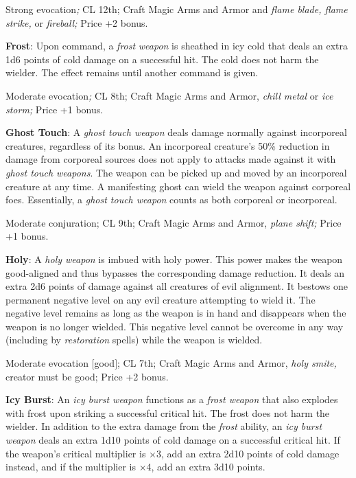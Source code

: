 Strong evocation\textit{; }CL 12th; Craft Magic Arms and Armor and \textit{flame blade, flame strike, }or \textit{fireball; }Price +2 bonus.
				
\textbf{Frost}: Upon command, a \textit{frost} \textit{weapon} is sheathed in icy cold that deals an extra 1d6 points of cold damage on a successful hit. The cold does not harm the wielder. The effect remains until another command is given.
				
Moderate evocation\textit{; }CL 8th; Craft Magic Arms and Armor, \textit{chill metal }or \textit{ice storm; }Price +1 bonus.
				
\textbf{Ghost Touch}: A \textit{ghost touch weapon} deals damage normally against incorporeal creatures, regardless of its bonus. An incorporeal creature's 50\% reduction in damage from corporeal sources does not apply to attacks made against it with \textit{ghost touch weapons}. The weapon can be picked up and moved by an incorporeal creature at any time. A manifesting ghost can wield the weapon against corporeal foes. Essentially, a \textit{ghost touch weapon} counts as both corporeal or incorporeal.
				
Moderate conjuration; CL 9th; Craft Magic Arms and Armor, \textit{plane shift; }Price +1 bonus.
				
\textbf{Holy}: A \textit{holy weapon} is imbued with holy power. This power makes the weapon good-aligned and thus bypasses the corresponding damage reduction. It deals an extra 2d6 points of damage against all creatures of evil alignment. It bestows one permanent negative level on any evil creature attempting to wield it. The negative level remains as long as the weapon is in hand and disappears when the weapon is no longer wielded. This negative level cannot be overcome in any way (including by \textit{restoration }spells) while the weapon is wielded.
				
Moderate evocation \mbox{$[$}good\mbox{$]$}; CL 7th; Craft Magic Arms and Armor, \textit{holy smite, }creator must be good; Price +2 bonus.
				
\textbf{Icy Burst}: An \textit{icy burst weapon} functions as a \textit{frost weapon} that also explodes with frost upon striking a successful critical hit. The frost does not harm the wielder. In addition to the extra damage from the \textit{frost} ability, an \textit{icy burst weapon} deals an extra 1d10 points of cold damage on a successful critical hit. If the weapon's critical multiplier is \mbox{$\times$}3, add an extra 2d10 points of cold damage instead, and if the multiplier is \mbox{$\times$}4, add an extra 3d10 points. 
				
